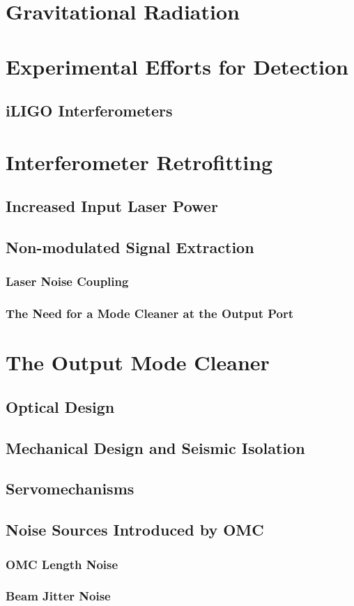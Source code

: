 \documentclass[12pt,vi,twoside]{mitthesis}
\begin{document}

\pagestyle{plain}

%


\chapter{Gravitational Radiation}

\chapter{Experimental Efforts for Detection}
\section{iLIGO Interferometers}

\chapter{Interferometer Retrofitting}
\section{Increased Input Laser Power}
\section{Non-modulated Signal Extraction}
\subsection{Laser Noise Coupling}
\subsection{The Need for a Mode Cleaner at the Output Port}

\chapter{The Output Mode Cleaner}
\section{Optical Design}
\section{Mechanical Design and Seismic Isolation}
\section{Servomechanisms}
\section{Noise Sources Introduced by OMC}
\subsection{OMC Length Noise}
\subsection{Beam Jitter Noise}

\appendix



\end{document}
